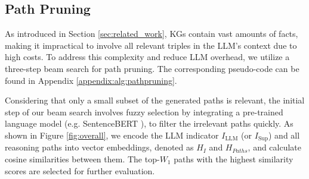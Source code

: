 \vspace{-1pt}
\subsection{Path Pruning}
\label{method:3pathprune}




As introduced in Section \ref{sec:related_work}, KGs contain vast amounts of facts,
making it impractical to involve all relevant triples in the LLM’s context due to high costs. To address this complexity and reduce LLM overhead, we utilize a three-step beam search for path pruning. The corresponding pseudo-code can be found in Appendix \ref{appendix:alg:pathpruning}.




Considering that only a small subset of the generated paths is relevant,
the initial step of our beam search involves fuzzy selection by integrating a pre-trained language model (e.g. SentenceBERT \cite{reimers-gurevych-2019-sentence}), to filter the irrelevant paths quickly.
As shown in Figure \ref{fig:overall}, we encode the LLM indicator $I_{\text{LLM}}$ (or $I_{\text{Sup}}$) and all reasoning paths into vector embeddings, denoted as $H_I$ and $H_{Paths}$, and calculate cosine similarities between them. The top-$W_1$ paths with the highest similarity scores are  selected for further evaluation.

